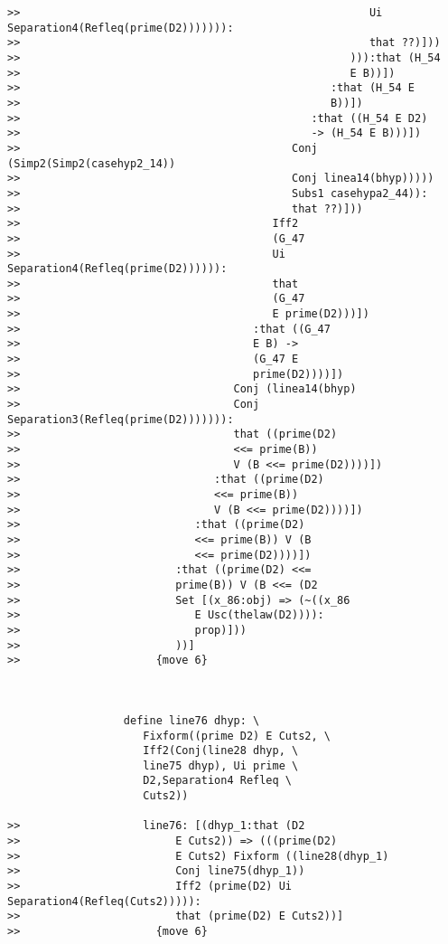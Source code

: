 \documentclass[12pt]{article}
\begin{document}
\begin{verbatim}
>>                                                      Ui Separation4(Refleq(prime(D2))))))):
>>                                                      that ??)]))
>>                                                   ))):that (H_54
>>                                                   E B))])
>>                                                :that (H_54 E
>>                                                B))])
>>                                             :that ((H_54 E D2)
>>                                             -> (H_54 E B)))])
>>                                          Conj (Simp2(Simp2(casehyp2_14))
>>                                          Conj linea14(bhyp)))))
>>                                          Subs1 casehypa2_44)):
>>                                          that ??)]))
>>                                       Iff2
>>                                       (G_47
>>                                       Ui Separation4(Refleq(prime(D2)))))):
>>                                       that
>>                                       (G_47
>>                                       E prime(D2)))])
>>                                    :that ((G_47
>>                                    E B) ->
>>                                    (G_47 E
>>                                    prime(D2))))])
>>                                 Conj (linea14(bhyp)
>>                                 Conj Separation3(Refleq(prime(D2))))))):
>>                                 that ((prime(D2)
>>                                 <<= prime(B))
>>                                 V (B <<= prime(D2))))])
>>                              :that ((prime(D2)
>>                              <<= prime(B))
>>                              V (B <<= prime(D2))))])
>>                           :that ((prime(D2)
>>                           <<= prime(B)) V (B
>>                           <<= prime(D2))))])
>>                        :that ((prime(D2) <<=
>>                        prime(B)) V (B <<= (D2
>>                        Set [(x_86:obj) => (~((x_86
>>                           E Usc(thelaw(D2)))):
>>                           prop)]))
>>                        ))]
>>                     {move 6}



                  define line76 dhyp: \
                     Fixform((prime D2) E Cuts2, \
                     Iff2(Conj(line28 dhyp, \
                     line75 dhyp), Ui prime \
                     D2,Separation4 Refleq \
                     Cuts2))

>>                   line76: [(dhyp_1:that (D2
>>                        E Cuts2)) => (((prime(D2)
>>                        E Cuts2) Fixform ((line28(dhyp_1)
>>                        Conj line75(dhyp_1))
>>                        Iff2 (prime(D2) Ui Separation4(Refleq(Cuts2))))):
>>                        that (prime(D2) E Cuts2))]
>>                     {move 6}




\end{verbatim}
\end{document}

